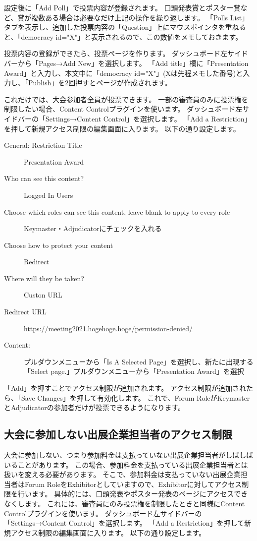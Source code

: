 \documentclass[titlepage,10pt,a4paper,uplatex]{jsbook}
\begin{document}
設定後に「Add Poll」で投票内容が登録されます。
口頭発表賞とポスター賞など、賞が複数ある場合は必要なだけ上記の操作を繰り返します。
「Polls List」タブを表示し、追加した投票内容の「Question」上にマウスポインタを重ねると、「{\lbrack}democracy id="X"{\rbrack}」と表示されるので、この数値をメモしておきます。

投票内容の登録ができたら、投票ページを作ります。
ダッシュボード左サイドバーから「Pages→Add New」を選択します。
「Add title」欄に「Presentation Award」と入力し、本文中に「{\lbrack}democracy id="X"{\rbrack}」(Xは先程メモした番号)と入力し、「Publish」を2回押すとページが作成されます。

これだけでは、大会参加者全員が投票できます。
一部の審査員のみに投票権を制限したい場合、Content Controlプラグインを使います。
ダッシュボード左サイドバーの「Settings→Content Control」を選択します。
「Add a Restriction」を押して新規アクセス制限の編集画面に入ります。
以下の通り設定します。

\begin{description}
\item[General: Restriction Title] Presentation Award
\item[Who can see this content?] Logged In Users
\item[Choose which roles can see this content, leave blank to apply to every role] Keymaster・Adjudicatorにチェックを入れる
\item[Choose how to protect your content] Redirect
\item[Where will they be taken?] Custon URL
\item[Redirect URL] \url{https://meeting2021.hogehoge.hoge/permission-denied/}
\item[Content: ] プルダウンメニューから「Is A Selected Page」を選択し、新たに出現する「Select page.」プルダウンメニューから「Presentation Award」を選択
\end{description}

「Add」を押すことでアクセス制限が追加されます。
アクセス制限が追加されたら、「Save Changes」を押して有効化します。
これで、Forum RoleがKeymasterとAdjudicatorの参加者だけが投票できるようになります。

\subsection{大会に参加しない出展企業担当者のアクセス制限}

大会に参加しない、つまり参加料金は支払っていない出展企業担当者がしばしばいることがあります。
この場合、参加料金を支払っている出展企業担当者とは扱いを変える必要があります。
そこで、参加料金は支払っていない出展企業担当者はForum RoleをExhibitorとしていますので、Exhibitorに対してアクセス制限を行います。
具体的には、口頭発表やポスター発表のページにアクセスできなくします。
これには、審査員にのみ投票権を制限したときと同様にContent Controlプラグインを使います。
ダッシュボード左サイドバーの「Settings→Content Control」を選択します。
「Add a Restriction」を押して新規アクセス制限の編集画面に入ります。
以下の通り設定します。
\end{document}
